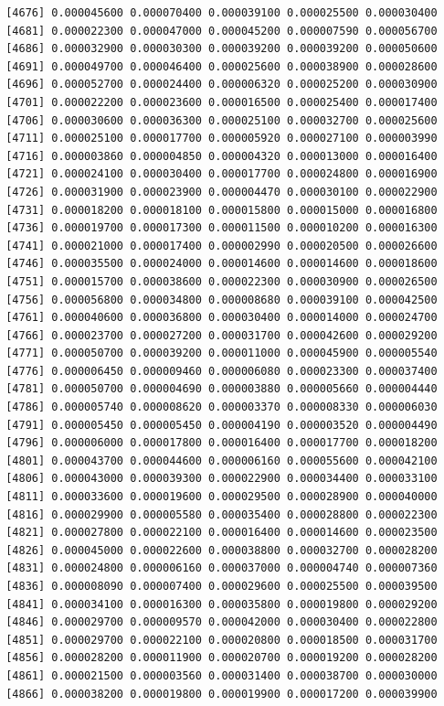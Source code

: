 \documentclass[]{article}
\begin{document}
\begin{verbatim}
 [4676] 0.000045600 0.000070400 0.000039100 0.000025500 0.000030400
 [4681] 0.000022300 0.000047000 0.000045200 0.000007590 0.000056700
 [4686] 0.000032900 0.000030300 0.000039200 0.000039200 0.000050600
 [4691] 0.000049700 0.000046400 0.000025600 0.000038900 0.000028600
 [4696] 0.000052700 0.000024400 0.000006320 0.000025200 0.000030900
 [4701] 0.000022200 0.000023600 0.000016500 0.000025400 0.000017400
 [4706] 0.000030600 0.000036300 0.000025100 0.000032700 0.000025600
 [4711] 0.000025100 0.000017700 0.000005920 0.000027100 0.000003990
 [4716] 0.000003860 0.000004850 0.000004320 0.000013000 0.000016400
 [4721] 0.000024100 0.000030400 0.000017700 0.000024800 0.000016900
 [4726] 0.000031900 0.000023900 0.000004470 0.000030100 0.000022900
 [4731] 0.000018200 0.000018100 0.000015800 0.000015000 0.000016800
 [4736] 0.000019700 0.000017300 0.000011500 0.000010200 0.000016300
 [4741] 0.000021000 0.000017400 0.000002990 0.000020500 0.000026600
 [4746] 0.000035500 0.000024000 0.000014600 0.000014600 0.000018600
 [4751] 0.000015700 0.000038600 0.000022300 0.000030900 0.000026500
 [4756] 0.000056800 0.000034800 0.000008680 0.000039100 0.000042500
 [4761] 0.000040600 0.000036800 0.000030400 0.000014000 0.000024700
 [4766] 0.000023700 0.000027200 0.000031700 0.000042600 0.000029200
 [4771] 0.000050700 0.000039200 0.000011000 0.000045900 0.000005540
 [4776] 0.000006450 0.000009460 0.000006080 0.000023300 0.000037400
 [4781] 0.000050700 0.000004690 0.000003880 0.000005660 0.000004440
 [4786] 0.000005740 0.000008620 0.000003370 0.000008330 0.000006030
 [4791] 0.000005450 0.000005450 0.000004190 0.000003520 0.000004490
 [4796] 0.000006000 0.000017800 0.000016400 0.000017700 0.000018200
 [4801] 0.000043700 0.000044600 0.000006160 0.000055600 0.000042100
 [4806] 0.000043000 0.000039300 0.000022900 0.000034400 0.000033100
 [4811] 0.000033600 0.000019600 0.000029500 0.000028900 0.000040000
 [4816] 0.000029900 0.000005580 0.000035400 0.000028800 0.000022300
 [4821] 0.000027800 0.000022100 0.000016400 0.000014600 0.000023500
 [4826] 0.000045000 0.000022600 0.000038800 0.000032700 0.000028200
 [4831] 0.000024800 0.000006160 0.000037000 0.000004740 0.000007360
 [4836] 0.000008090 0.000007400 0.000029600 0.000025500 0.000039500
 [4841] 0.000034100 0.000016300 0.000035800 0.000019800 0.000029200
 [4846] 0.000029700 0.000009570 0.000042000 0.000030400 0.000022800
 [4851] 0.000029700 0.000022100 0.000020800 0.000018500 0.000031700
 [4856] 0.000028200 0.000011900 0.000020700 0.000019200 0.000028200
 [4861] 0.000021500 0.000003560 0.000031400 0.000038700 0.000030000
 [4866] 0.000038200 0.000019800 0.000019900 0.000017200 0.000039900

\end{verbatim}
\end{document}
